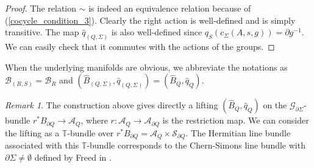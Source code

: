 \documentclass[a4paper,a4paper]{article}
\theoremstyle{definition}
\theoremstyle{remark}
\newtheorem*{rem}{Remark}
\newcommand{\T}{\mathbb{T}}
\newcommand{\A}{\mathcal{A}}
\newcommand{\B}{\mathcal{B}}
\newcommand{\G}{\mathcal{G}}
\newcommand{\hq}{\widehat{q}}
\renewcommand{\S}{\mathcal{S}}
\def\h#1{ \widehat{#1} }
\begin{document}
\begin{proof}
The relation $\sim$ is indeed an equivalence relation because of (\ref{cocycle_condition_3}). Clearly the right action is well-defined and is simply transitive. The map $\hq_{(Q, \Sigma)}$ is also well-defined since $q_S(c_\Sigma(A, s, g)) = \partial g^{-1}$. We can easily check that it commutes with the actions of the groups.
\end{proof}

When the underlying manifolds are obvious, we abbreviate the notations as $\B_{(R, S)} = \B_R$ and $(\h{B}_{(Q, \Sigma)}, \hq_{(Q, \Sigma)}) = (\h{B}_Q, \hq_Q)$.

\begin{rem}
The construction above gives directly a lifting $(\h{B}_Q, \hq_Q)$ on the $\G_{\partial \Sigma}$-bundle $r^*B_{\partial Q} \to \A_Q$, where $r : \A_Q \to \A_{\partial Q}$ is the restriction map. We can consider the lifting as a $\T$-bundle over $r^*B_{\partial Q} = \A_Q \times \S_{\partial Q}$. The Hermitian line bundle associated with this $\T$-bundle corresponds to the Chern-Simons line bundle with $\partial \Sigma \neq \emptyset$ defined by Freed in \cite{F1}. 
\end{rem}
\end{document}
